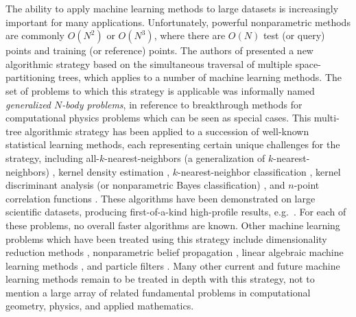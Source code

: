 \documentclass{article}
\begin{document}
The ability to apply machine learning methods to large datasets is
increasingly important for many applications.  Unfortunately,
powerful nonparametric methods are commonly $O(N^2)$ or
$O(N^3)$, where there are $O(N)$ test (or query) points and training
(or reference) points.
The authors of \cite{nips2000paper} presented a new algorithmic strategy
based on the simultaneous traversal of multiple space-partitioning
trees, which applies to a number of machine learning methods.  The set
of problems to which this strategy is applicable was informally named
{\em generalized $N$-body problems}, in reference to breakthrough
methods for computational physics problems \cite{appel2,barnes_hut,grngard}
which can be seen as special cases.
This multi-tree algorithmic strategy has been applied to a succession
of well-known statistical learning methods, each representing certain
unique challenges for the strategy, including
all-$k$-nearest-neighbors (a generalization of $k$-nearest-neighbors)
\cite{nips2000paper}, kernel density estimation \cite{nips2000paper,
kde-siamdm, kde-nips-dong, kde-uai-dong},
$k$-nearest-neighbor classification \cite{ting-liu}, kernel discriminant
analysis (or nonparametric Bayes classification) \cite{nbc-compstat}, and $n$-point correlation functions \cite{nips2000paper,
moore-npt}.  These algorithms have been demonstrated on
large scientific datasets, producing first-of-a-kind high-profile
results, e.g.~\cite{science03, nature05}.  For each of these
problems, no overall faster algorithms are known.  Other machine
learning problems which have been treated using this strategy include
dimensionality reduction methods \cite{hochreiter00beyond}, nonparametric
belief propagation \cite{alex-ihler}, linear algebraic machine learning methods \cite{freitas_fast},
and particle filters \cite{klaas-toward}.
Many other current and future machine learning methods remain to be
treated in depth with this strategy, not to mention a large array of
related fundamental problems in computational geometry, physics, and
applied mathematics.  
\end{document}
